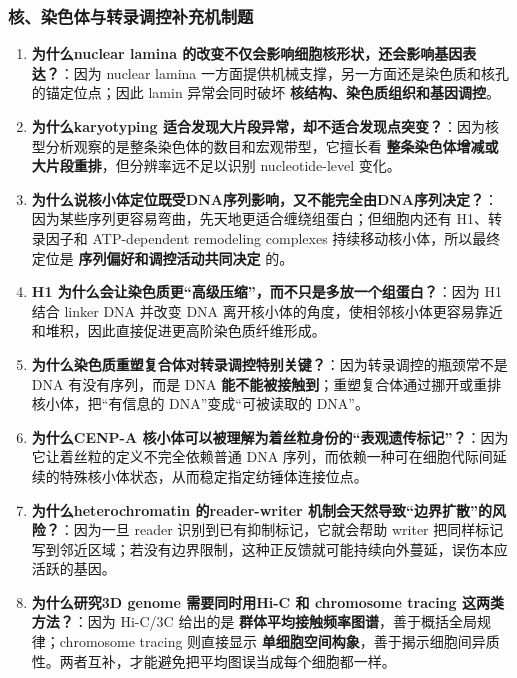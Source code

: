 \documentclass[12pt,fontset=none]{ctexart}
\begin{document}
\subsubsection*{核、染色体与转录调控补充机制题}
\begin{enumerate}
\item \textbf{为什么nuclear lamina 的改变不仅会影响细胞核形状，还会影响基因表达？}：因为 nuclear lamina 一方面提供机械支撑，另一方面还是染色质和核孔的锚定位点；因此 lamin 异常会同时破坏 \textbf{核结构、染色质组织和基因调控}。

\item \textbf{为什么karyotyping 适合发现大片段异常，却不适合发现点突变？}：因为核型分析观察的是整条染色体的数目和宏观带型，它擅长看 \textbf{整条染色体增减或大片段重排}，但分辨率远不足以识别 nucleotide-level 变化。

\item \textbf{为什么说核小体定位既受DNA序列影响，又不能完全由DNA序列决定？}：因为某些序列更容易弯曲，先天地更适合缠绕组蛋白；但细胞内还有 H1、转录因子和 ATP-dependent remodeling complexes 持续移动核小体，所以最终定位是 \textbf{序列偏好和调控活动共同决定} 的。

\item \textbf{H1 为什么会让染色质更“高级压缩”，而不只是多放一个组蛋白？}：因为 H1 结合 linker DNA 并改变 DNA 离开核小体的角度，使相邻核小体更容易靠近和堆积，因此直接促进更高阶染色质纤维形成。

\item \textbf{为什么染色质重塑复合体对转录调控特别关键？}：因为转录调控的瓶颈常不是 DNA 有没有序列，而是 DNA \textbf{能不能被接触到}；重塑复合体通过挪开或重排核小体，把“有信息的 DNA”变成“可被读取的 DNA”。

\item \textbf{为什么CENP-A 核小体可以被理解为着丝粒身份的“表观遗传标记”？}：因为它让着丝粒的定义不完全依赖普通 DNA 序列，而依赖一种可在细胞代际间延续的特殊核小体状态，从而稳定指定纺锤体连接位点。

\item \textbf{为什么heterochromatin 的reader-writer 机制会天然导致“边界扩散”的风险？}：因为一旦 reader 识别到已有抑制标记，它就会帮助 writer 把同样标记写到邻近区域；若没有边界限制，这种正反馈就可能持续向外蔓延，误伤本应活跃的基因。

\item \textbf{为什么研究3D genome 需要同时用Hi-C 和 chromosome tracing 这两类方法？}：因为 Hi-C/3C 给出的是 \textbf{群体平均接触频率图谱}，善于概括全局规律；chromosome tracing 则直接显示 \textbf{单细胞空间构象}，善于揭示细胞间异质性。两者互补，才能避免把平均图误当成每个细胞都一样。


\end{enumerate}
\end{document}
